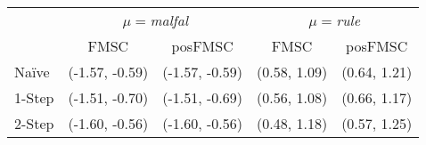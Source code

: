 \begin{tabular}{lcccc} 
 \hline \hline 
 & \multicolumn{2}{c}{\emph{$\mu=$malfal}} & \multicolumn{2}{c}{$\mu=$\emph{rule}}\\ 
 & FMSC & posFMSC & FMSC & posFMSC\\ 
 \hline 
Na\"{i}ve & (-1.57, -0.59) & (-1.57, -0.59) & (0.58, 1.09) & (0.64, 1.21) \\ 
 1-Step & (-1.51, -0.70) & (-1.51, -0.69) & (0.56, 1.08) & (0.66, 1.17) \\ 
 2-Step & (-1.60, -0.56) & (-1.60, -0.56) & (0.48, 1.18) & (0.57, 1.25)\\ 
 \hline 
\end{tabular}